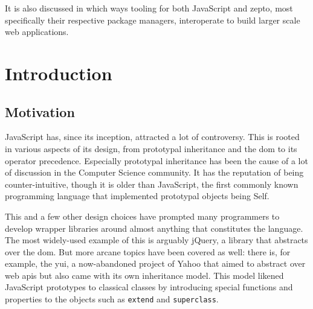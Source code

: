 \documentclass[oneside,11pt,xetex]{scrbook}
\begin{document}
It is also discussed in which ways tooling for both JavaScript and zepto, most specifically
their respective package managers, interoperate to build larger scale web applications.

\tableofcontents

\printglossary[type=\acronymtype,title=Abbreviations]

\mainmatter

\pagestyle{headings}

\chapter{Introduction}
\label{chap:intro}

\section{Motivation}
\label{sec:Motivation}

JavaScript has, since its inception, attracted a lot of controversy. This is rooted
in various aspects of its design, from prototypal inheritance and the \gls{dom} to
its operator precedence. Especially prototypal inheritance  has been the cause
of a lot of discussion in the Computer Science community. It has the reputation of
being counter-intuitive, though it is older than JavaScript, the first commonly known
programming language that implemented prototypal objects being Self.

This and a few other design choices have prompted many programmers to develop
wrapper libraries around almost anything that constitutes the language. The most widely-used
example of this is arguably jQuery, a library that abstracts over the \gls{dom}.
But more arcane topics have been covered as well: there is, for example, the \gls{yui}, a now-abandoned
project of Yahoo that aimed to abstract over web \glspl{api} but also came with
its own inheritance model. This model likened JavaScript prototypes to classical classes by
introducing special functions and properties to the objects such as \texttt{extend}
and \texttt{superclass}.
\end{document}
